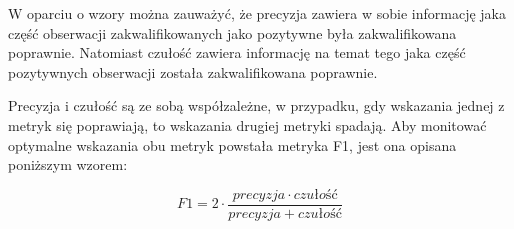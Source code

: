 
W oparciu o wzory można zauważyć, że precyzja zawiera w sobie informację jaka część obserwacji zakwalifikowanych jako pozytywne była zakwalifikowana poprawnie. Natomiast czułość zawiera informację na temat tego jaka część pozytywnych obserwacji została zakwalifikowana poprawnie.

Precyzja i czułość są ze sobą współzależne, w przypadku, gdy wskazania jednej z metryk się poprawiają, to wskazania drugiej metryki spadają. Aby monitować optymalne wskazania obu metryk powstała metryka F1, jest ona opisana poniższym wzorem:

$$
    F1 = 2 \cdot \frac{precyzja \cdot czułość}{precyzja + czułość}
$$








